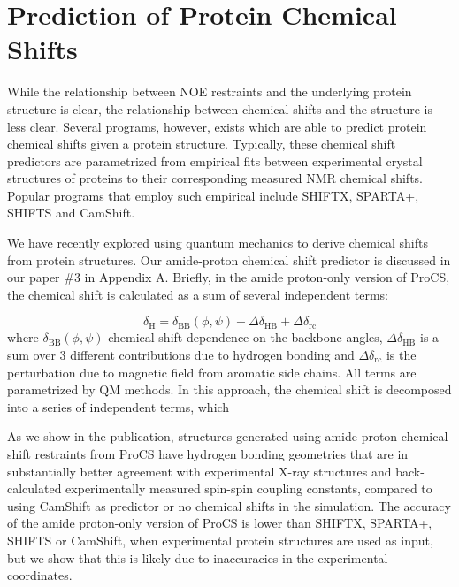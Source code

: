 \chapter{Prediction of Protein Chemical Shifts}

While the relationship between NOE restraints and the underlying protein structure is clear,
the relationship between chemical shifts and the structure is less clear.
Several programs, however, exists which are able to predict protein chemical shifts given a protein structure.
Typically, these chemical shift predictors are parametrized from empirical fits between experimental crystal structures of proteins to their corresponding measured NMR chemical shifts.
Popular programs that employ such empirical include SHIFTX, SPARTA+, SHIFTS and CamShift.

We have recently explored using quantum mechanics to derive chemical shifts from protein structures. Our amide-proton chemical shift predictor is discussed in our paper \#3 in Appendix A.
Briefly, in the amide proton-only version of ProCS, the chemical shift is calculated as a sum of several independent terms:

\begin{equation}
    \delta_\mathrm{H} = \delta_\mathrm{BB}(\phi,\psi) + \Delta\delta_\mathrm{HB} + \Delta\delta_\mathrm{rc}
\end{equation}
where $\delta_\mathrm{BB}(\phi,\psi)$ chemical shift dependence on the backbone angles, $\Delta\delta_\mathrm{HB}$ is a sum over 3 different contributions due to hydrogen bonding and $\Delta\delta_\mathrm{rc}$ is the perturbation due to magnetic field from aromatic side chains.
All terms are parametrized by QM methods.
In this approach, the chemical shift is decomposed into a series of independent terms, which


As we show in the publication, structures generated using amide-proton chemical shift restraints from ProCS have hydrogen bonding geometries that are in substantially better agreement with experimental X-ray structures and back-calculated experimentally measured spin-spin coupling constants, compared to using CamShift as predictor or no chemical shifts in the simulation.
The accuracy of the amide proton-only version of ProCS is lower than SHIFTX, SPARTA+, SHIFTS or CamShift, when experimental protein structures are used as input, but we show that this is likely due to inaccuracies in the experimental coordinates.%

